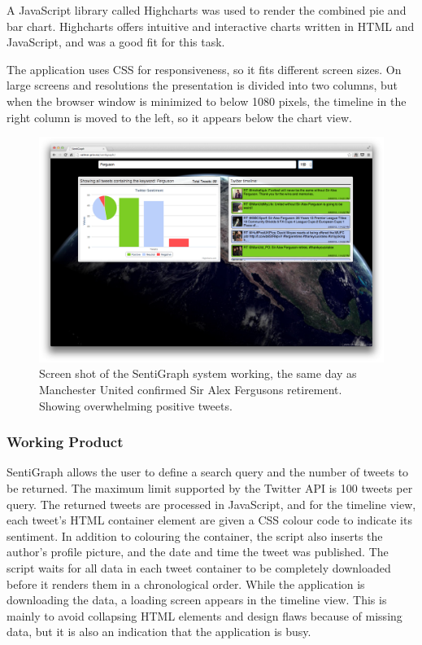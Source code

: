 A JavaScript library called Highcharts was used to render the combined pie and bar chart. Highcharts offers intuitive and interactive charts written in HTML and JavaScript, and was a good fit for this task. 

The application uses CSS for responsiveness, so it fits different screen sizes. On large screens and resolutions the presentation is divided into two columns, but when the browser window is minimized to below 1080 pixels, the timeline in the right column is moved to the left, so it appears below the chart view.

\begin{figure}[htb!]
\begin{center}
 \includegraphics[width=\textwidth]{../img/screenshot_sentigraph.png}
 \caption[SentiGraph screen shot]{Screen shot of the SentiGraph system working, the same day as Manchester United confirmed Sir Alex Fergusons retirement. Showing overwhelming positive tweets.}
 \label{fig:sentigraph_screenshot}
\end{center}
\end{figure}

\subsubsection{Working Product}

SentiGraph allows the user to define a search query and the number of tweets to be returned. The maximum limit supported by the Twitter API is 100 tweets per query. The returned tweets are processed in JavaScript, and for the timeline view, each tweet's HTML container element are given a CSS colour code to indicate its sentiment. In addition to colouring the container, the script also inserts the author's profile picture, and the date and time the tweet was published. The script waits for all data in each tweet container to be completely downloaded before it renders them in a chronological order. While the application is downloading the data, a loading screen appears in the timeline view. This is mainly to avoid collapsing HTML elements and design flaws because of missing data, but it is also an indication that the application is busy.

